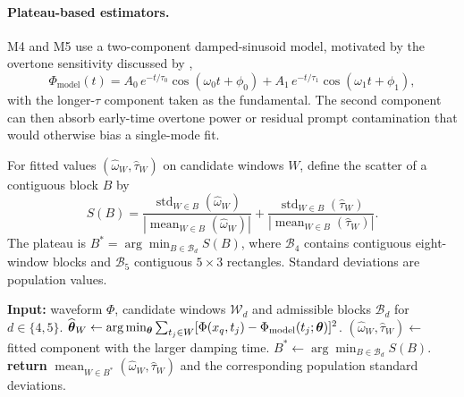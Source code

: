 \paragraph{Plateau-based estimators.} M4 and M5 use a
two-component damped-sinusoid model, motivated by the overtone
sensitivity discussed by \citet{Giesler2019overtones},
\begin{equation}
  \Phi_{\mathrm{model}}(t) =
  A_0\,e^{-t/\tau_0}\cos(\omega_0 t + \phi_0)
  + A_1\,e^{-t/\tau_1}\cos(\omega_1 t + \phi_1),
  \label{eq:two-mode}
\end{equation}
with the longer-$\tau$ component taken as the fundamental. The second
component can then absorb early-time overtone power or residual prompt
contamination that would otherwise bias a single-mode fit.

\begin{definition}
\label{def:plateau}
For fitted values $(\widehat\omega_W,\widehat\tau_W)$ on candidate
windows $W$, define the scatter of a contiguous block $B$ by
\begin{equation}
  S(B)=
  \frac{\operatorname{std}_{W\in B}(\widehat\omega_W)}
  {|\operatorname{mean}_{W\in B}(\widehat\omega_W)|}
  +
  \frac{\operatorname{std}_{W\in B}(\widehat\tau_W)}
  {|\operatorname{mean}_{W\in B}(\widehat\tau_W)|}.
  \label{eq:plateau-score}
\end{equation}
The plateau is $B^*=\arg\min_{B\in\mathcal B_d}S(B)$, where
$\mathcal B_4$ contains contiguous eight-window blocks and
$\mathcal B_5$ contiguous $5\times3$ rectangles. Standard deviations
are population values.
\end{definition}

\begin{algorithm}[H]
\caption{Plateau selection for M4 and M5.}
\label{alg:plateau}
\begin{algorithmic}[1]
\STATE \textbf{Input:} waveform $\Phi$, candidate windows
  $\mathcal W_d$ and admissible blocks $\mathcal B_d$ for
  $d\in\{4,5\}$.
  \STATE $\widehat{\boldsymbol\theta}_W\gets
    \arg\min_{\boldsymbol\theta}
    \sum_{t_j\in W}[\Phi(x_{q},t_j)-
    \Phi_{\mathrm{model}}(t_j;\boldsymbol\theta)]^2$.
  \STATE $(\widehat\omega_W,\widehat\tau_W)\gets$ fitted component
    with the larger damping time.
\ENDFOR
\STATE $B^*\gets\arg\min_{B\in\mathcal B_d}S(B)$.
\STATE \textbf{return} $\operatorname{mean}_{W\in B^*}
  (\widehat\omega_W,\widehat\tau_W)$ and the corresponding
  population standard deviations.
\end{algorithmic}
\end{algorithm}

